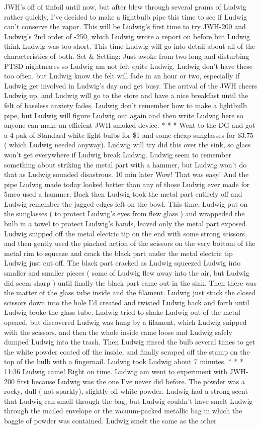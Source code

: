 \documentclass[12pt]{book}
\begin{document}
JWH's off of tinfoil until now, but after blew through several grams of Ludwig rather quickly, I've decided to make a lightbulb pipe this time to see if Ludwig can't conserve the vapor. This will be Ludwig's first time to try JWH-200 and Ludwig's 2nd order of -250, which Ludwig wrote a report on before but Ludwig think Ludwig was too short. This time Ludwig will go into detail about all of the characteristics of both. Set \& Setting: Just awoke from two long and disturbing PTSD nightmares so Ludwig am not felt quite Ludwig. Ludwig don't have these too often, but Ludwig know the felt will fade in an hour or two, especially if Ludwig get involved in Ludwig's day and get busy. The arrival of the JWH cheers Ludwig up, and Ludwig will go to the store and have a nice breakfast until the felt of baseless anxiety fades. Ludwig don't remember how to make a lightbulb pipe, but Ludwig will figure Ludwig out again and then write Ludwig here so anyone can make an efficient JWH smoked device. * * * Went to the DG and got a 4-pak of Standard white light bulbs for \$1 and some cheap sunglasses for \$3.75 ( which Ludwig needed anyway). Ludwig will try did this over the sink, so glass won't get everywhere if Ludwig break Ludwig. Ludwig seem to remember something about striking the metal part with a hammer, but Ludwig won't do that as Ludwig sounded disastrous. 10 min later Wow! That was easy! And the pipe Ludwig made today looked better than any of those Ludwig ever made for 5meo used a hammer. Back then Ludwig took the metal part entirely off and Ludwig remember the jagged edges left on the bowl. This time, Ludwig put on the sunglasses ( to protect Ludwig's eyes from flew glass ) and wrappeded the bulb in a towel to protect Ludwig's hands, leaved only the metal part exposed. Ludwig snipped off the metal electric tip on the end with some strong scissors, and then gently used the pinched action of the scissors on the very bottom of the metal rim to squeeze and crack the black part under the metal electric tip Ludwig just cut off. The black part cracked as Ludwig squeezed Ludwig into smaller and smaller pieces ( some of Ludwig flew away into the air, but Ludwig did seem sharp ) until finally the black part came out in the sink. Then there was the matter of the glass tube inside and the filament. Ludwig just stuck the closed scissors down into the hole I'd created and twisted Ludwig back and forth until Ludwig broke the glass tube. Ludwig tried to shake Ludwig out of the metal opened, but discovered Ludwig was hung by a filament, which Ludwig snipped with the scissors, and then the whole inside came loose and Ludwig safely dumped Ludwig into the trash. Then Ludwig rinsed the bulb several times to get the white powder coated off the inside, and finally scraped off the stamp on the top of the bulb with a fingernail. Ludwig took Ludwig about 7 minutes. * * * 11:36 Ludwig came! Right on time. Ludwig am went to experiment with JWH-200 first because Ludwig was the one I've never did before. The powder was a rocky, dull ( not sparkly), slightly off-white powder. Ludwig had a strong scent that Ludwig can smell through the bag, but Ludwig couldn't have smelt Ludwig through the mailed envelope or the vacuum-packed metallic bag in which the baggie of powder was contained. Ludwig smelt the same as the other 
\end{document}
